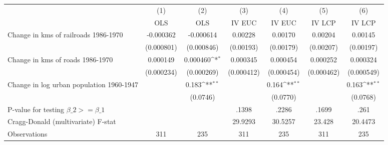 {
\def\sym#1{\ifmmode^{#1}\else\(^{#1}\)\fi}
\begin{tabular}{l*{6}{c}}
\hline\hline
                &\multicolumn{1}{c}{(1)}&\multicolumn{1}{c}{(2)}&\multicolumn{1}{c}{(3)}&\multicolumn{1}{c}{(4)}&\multicolumn{1}{c}{(5)}&\multicolumn{1}{c}{(6)}\\
                &\multicolumn{1}{c}{OLS}&\multicolumn{1}{c}{OLS}&\multicolumn{1}{c}{IV EUC}&\multicolumn{1}{c}{IV EUC}&\multicolumn{1}{c}{IV LCP}&\multicolumn{1}{c}{IV LCP}\\
\hline
Change in kms of railroads 1986-1970&-0.000362         &-0.000614         &  0.00228         &  0.00170         &  0.00204         &  0.00145         \\
                &(0.000801)         &(0.000846)         &(0.00193)         &(0.00179)         &(0.00207)         &(0.00197)         \\
[1em]
Change in kms of roads 1986-1970& 0.000149         & 0.000460\sym{*}  & 0.000345         & 0.000454         & 0.000252         & 0.000324         \\
                &(0.000234)         &(0.000269)         &(0.000412)         &(0.000454)         &(0.000462)         &(0.000549)         \\
[1em]
Change in log urban population 1960-1947&                  &    0.183\sym{**} &                  &    0.164\sym{**} &                  &    0.163\sym{**} \\
                &                  & (0.0746)         &                  & (0.0770)         &                  & (0.0768)         \\
\hline
P-value for testing $\beta\_{2} >= \beta\_{1}$&                  &                  &    .1398         &    .2286         &    .1699         &     .261         \\
Cragg-Donald (multivariate) F-stat&                  &                  &  29.9293         &  30.5257         &   23.428         &  20.4473         \\
Observations    &      311         &      235         &      311         &      235         &      311         &      235         \\
\hline\hline
\end{tabular}
}
